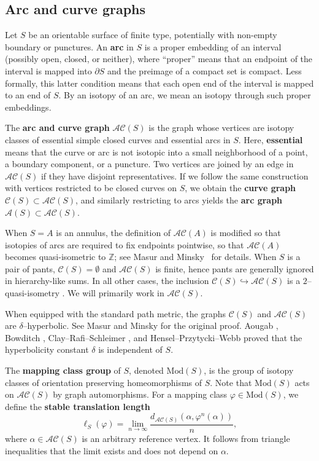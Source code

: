 \documentclass[11pt,letterpaper]{amsart}
\newcommand{\A}[0]{\mathcal{A}}
\newcommand{\ZZ}[0]{\mathbb{Z}}
\numberwithin{equation}{section}
\theoremstyle{definition}
\newcommand{\C}{\mathcal{C}}
\newcommand{\Mod}{\mathrm{Mod}}
\newcommand{\define}[1]{\textbf{#1}}
\newcommand{\AC}{\mathcal{AC}}
\begin{document}
\subsection{Arc and curve graphs}
Let $S$ be an orientable surface of finite type, potentially with non-empty boundary or punctures. 
An \define{arc} in $S$ is a proper embedding of an interval (possibly open, closed, or neither), where ``proper'' means that an endpoint of the interval is mapped into $\partial S$ and the preimage of a compact set is compact. Less formally, this latter condition means that each open end of the interval is mapped to an end of $S$. By an isotopy of an arc, we mean an isotopy through such proper embeddings.

The \define{arc and curve graph} $\AC(S)$ is the graph whose vertices are isotopy classes of essential simple closed curves and essential arcs in $S$. Here, \define{essential} means that the curve or arc is not isotopic into a small neighborhood of a point, a boundary component, or a puncture. 
Two vertices are joined by an edge in $\AC(S)$ if they have disjoint representatives.
If we follow the same construction with vertices restricted to be closed curves on $S$, we obtain the \define{curve graph} $\C(S)\subset \AC(S)$, and similarly restricting to arcs yields the \define{arc graph} $\A(S)\subset \AC(S)$.

When $S = A$ is an annulus, the definition of $\AC(A)$ is modified so that isotopies of arcs are required to fix endpoints pointwise, so that $\AC(A)$ becomes quasi-isometric to $\ZZ$; see Masur and Minsky~\cite{MasurMinsky2} for details. 
When $S$ is a pair of pants, $\C(S) = \emptyset$ and $\AC(S)$ is finite, hence pants are generally ignored in hierarchy-like sums. 
In all other cases, the inclusion $\C(S) \hookrightarrow \AC(S)$ is a $2$--quasi-isometry \cite[Lemma 2.2]{MasurMinsky2}.  We will primarily work in $\AC(S)$.

When equipped with the standard path metric, the graphs $\C(S)$ and $\AC(S)$ are $\delta$--hyperbolic. See Masur and Minsky \cite{MasurMinsky1} for the original proof. Aougab \cite{Aougab:UniformHyperbolicity}, Bowditch \cite{Bowditch:UniformHyperbolicity}, Clay--Rafi--Schleimer \cite{CRS:UniformHyperbolicity}, and Hensel--Przytycki--Webb \cite{HPW:SlimUnicorns} proved that the hyperbolicity constant $\delta$ is independent of $S$.

The \define{mapping class group} of $S$, denoted $\Mod (S)$, is the group of isotopy classes of orientation preserving homeomorphisms of $S$. Note that $\Mod(S)$ acts on $\AC(S)$ by graph automorphisms. For a mapping class $\varphi \in \Mod(S)$, we define the \define{stable translation length}
\begin{equation}\label{Eqn:StableLength}
\ell_S(\varphi) = \lim_{n \to \infty} \frac {d_{\AC(S)}(\alpha, \varphi^n(\alpha))}{n},
\end{equation}
where $\alpha \in \AC(S)$ is an arbitrary reference vertex. It follows from triangle inequalities that the limit exists and does not depend on $\alpha$.
\end{document}
